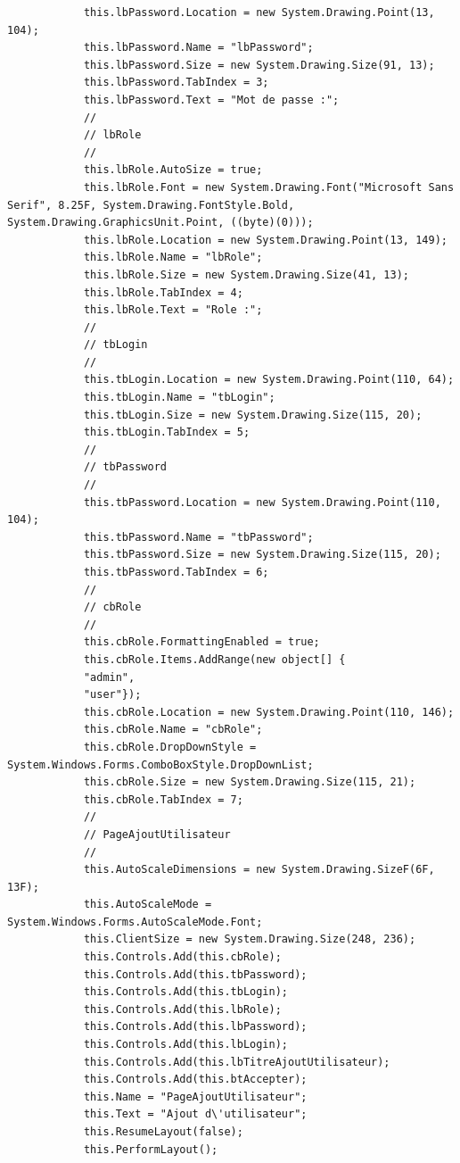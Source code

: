 \documentclass[main.tex]{subfiles}
\begin{document}
\begin{lstlisting}
            this.lbPassword.Location = new System.Drawing.Point(13, 104);
            this.lbPassword.Name = "lbPassword";
            this.lbPassword.Size = new System.Drawing.Size(91, 13);
            this.lbPassword.TabIndex = 3;
            this.lbPassword.Text = "Mot de passe :";
            // 
            // lbRole
            // 
            this.lbRole.AutoSize = true;
            this.lbRole.Font = new System.Drawing.Font("Microsoft Sans Serif", 8.25F, System.Drawing.FontStyle.Bold, System.Drawing.GraphicsUnit.Point, ((byte)(0)));
            this.lbRole.Location = new System.Drawing.Point(13, 149);
            this.lbRole.Name = "lbRole";
            this.lbRole.Size = new System.Drawing.Size(41, 13);
            this.lbRole.TabIndex = 4;
            this.lbRole.Text = "Role :";
            // 
            // tbLogin
            // 
            this.tbLogin.Location = new System.Drawing.Point(110, 64);
            this.tbLogin.Name = "tbLogin";
            this.tbLogin.Size = new System.Drawing.Size(115, 20);
            this.tbLogin.TabIndex = 5;
            // 
            // tbPassword
            // 
            this.tbPassword.Location = new System.Drawing.Point(110, 104);
            this.tbPassword.Name = "tbPassword";
            this.tbPassword.Size = new System.Drawing.Size(115, 20);
            this.tbPassword.TabIndex = 6;
            // 
            // cbRole
            // 
            this.cbRole.FormattingEnabled = true;
            this.cbRole.Items.AddRange(new object[] {
            "admin",
            "user"});
            this.cbRole.Location = new System.Drawing.Point(110, 146);
            this.cbRole.Name = "cbRole";
            this.cbRole.DropDownStyle = System.Windows.Forms.ComboBoxStyle.DropDownList;
            this.cbRole.Size = new System.Drawing.Size(115, 21);
            this.cbRole.TabIndex = 7;
            // 
            // PageAjoutUtilisateur
            // 
            this.AutoScaleDimensions = new System.Drawing.SizeF(6F, 13F);
            this.AutoScaleMode = System.Windows.Forms.AutoScaleMode.Font;
            this.ClientSize = new System.Drawing.Size(248, 236);
            this.Controls.Add(this.cbRole);
            this.Controls.Add(this.tbPassword);
            this.Controls.Add(this.tbLogin);
            this.Controls.Add(this.lbRole);
            this.Controls.Add(this.lbPassword);
            this.Controls.Add(this.lbLogin);
            this.Controls.Add(this.lbTitreAjoutUtilisateur);
            this.Controls.Add(this.btAccepter);
            this.Name = "PageAjoutUtilisateur";
            this.Text = "Ajout d\'utilisateur";
            this.ResumeLayout(false);
            this.PerformLayout();


\end{lstlisting}
\end{document}
